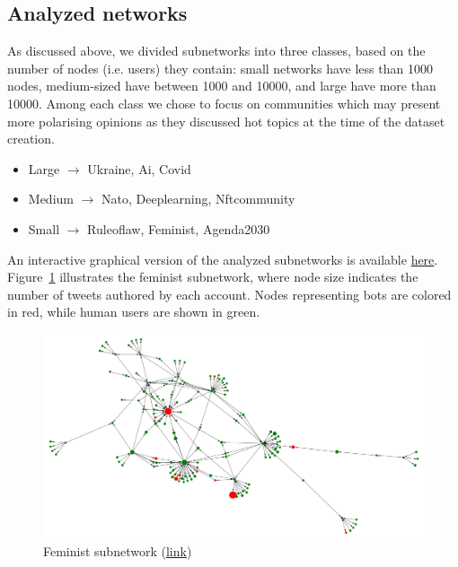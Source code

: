 \documentclass[12pt, a4paper]{article}
\begin{document}
	\subsection{Analyzed networks}
    	As discussed above, we divided subnetworks into three classes, based on the number of nodes (i.e. users) they contain: small networks have less than 1000 nodes, medium-sized have between 1000 and 10000, and large have more than 10000. Among each class we chose to focus on communities which may present more polarising opinions as they discussed hot topics at the time of the dataset creation.
    	\begin{itemize}
			\item Large $\rightarrow$ Ukraine, Ai, Covid
			\item Medium $\rightarrow$ Nato, Deeplearning, Nftcommunity
			\item Small $\rightarrow$ Ruleoflaw, Feminist, Agenda2030
		\end{itemize}
		An interactive graphical version of the analyzed subnetworks is available \href{https://alessiacrimaldi.github.io/sna_project/}{here}. Figure~\ref{fig:feminist_subnetwork} illustrates the feminist subnetwork, where node size indicates the number of tweets authored by each account. Nodes representing bots are colored in red, while human users are shown in green.
		\begin{figure}[H]
    		\centering
    		\includegraphics[width=\textwidth]{feminist_subnetwork.png}
    		\caption{Feminist subnetwork {\footnotesize (\href{https://alessiacrimaldi.github.io/sna_project/results/subnetworks/feminist/feminist_network}{link})}}
    		\label{fig:feminist_subnetwork}
		\end{figure}
		
\end{document}
